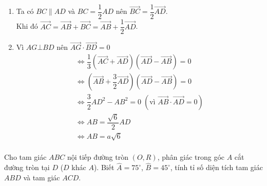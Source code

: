 \begin{bt}
{\begin{center}
		\end{center}
		\begin{enumerate}
			\item Ta có $BC\parallel AD$ và $BC=\dfrac{1}{2}AD$ nên $\overrightarrow{BC}=\dfrac{1}{2}\overrightarrow{AD}$.\\
			Khi đó $\overrightarrow{AC}=\overrightarrow{AB}+\overrightarrow{BC}=\overrightarrow{AB}+\dfrac{1}{2}\overrightarrow{AD}$.
			\item Vì $AG\bot BD$ nên $\overrightarrow{AG}\cdot\overrightarrow{BD}=0$
			\[\begin{array}{l}
				\Leftrightarrow \dfrac{1}{3}\left(\overrightarrow{AC}+\overrightarrow{AD}\right)\left(\overrightarrow{AD}-\overrightarrow{AB}\right)=0\\
				\Leftrightarrow \left(\overrightarrow{AB}+\dfrac{3}{2}\overrightarrow{AD}\right)\left(\overrightarrow{AD}-\overrightarrow{AB}\right)=0\\
				\Leftrightarrow \dfrac{3}{2}AD^2-AB^2=0\;\left(\text{vì } \overrightarrow{AB}\cdot\overrightarrow{AD}=0\right)\\
				\Leftrightarrow AB=\dfrac{\sqrt{6}}{2}AD\\
				\Leftrightarrow AB=a\sqrt{6}\\
			\end{array}\]
		\end{enumerate}
	}
\end{bt}


\begin{bt}%
	Cho tam giác $ ABC $ nội tiếp đường tròn $ (O,R) $, phân giác trong góc $ A $ cắt đường tròn tại $ D $ ($ D $ khác $ A $). Biết $ \widehat{A}=75^\circ $, $ \widehat{B}=45^\circ $, tính tỉ số diện tích tam giác $ ABD $ và tam giác $ ACD $.
\end{bt}


